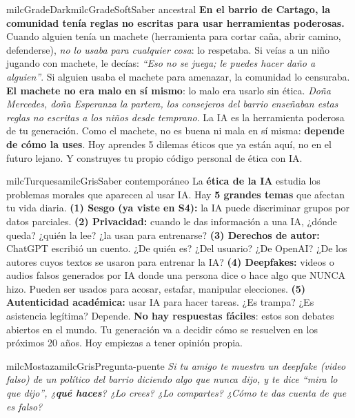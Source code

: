 \documentclass[11pt,letterpaper]{article}
\begin{document}
\begin{softbox}{milcGradeDark}{milcGradeSoft}{Saber ancestral}
\textbf{En el barrio de Cartago, la comunidad tenía reglas no escritas para usar herramientas poderosas.} Cuando alguien tenía un machete (herramienta para cortar caña, abrir camino, defenderse), \emph{no lo usaba para cualquier cosa}: lo respetaba. Si veías a un niño jugando con machete, le decías: \emph{``Eso no se juega; le puedes hacer daño a alguien''}. Si alguien usaba el machete para amenazar, la comunidad lo censuraba. \textbf{El machete no era malo en sí mismo}: lo malo era usarlo sin ética. \emph{Doña Mercedes, doña Esperanza la partera, los consejeros del barrio enseñaban estas reglas no escritas a los niños desde temprano}. La IA es la herramienta poderosa de tu generación. Como el machete, no es buena ni mala en sí misma: \textbf{depende de cómo la uses}. Hoy aprendes 5 dilemas éticos que ya están aquí, no en el futuro lejano. Y construyes tu propio código personal de ética con IA.
\end{softbox}

\begin{softbox}{milcTurquesa}{milcGris}{Saber contemporáneo}
La \textbf{ética de la IA} estudia los problemas morales que aparecen al usar IA. Hay \textbf{5 grandes temas} que afectan tu vida diaria. \textbf{(1) Sesgo (ya viste en S4):} la IA puede discriminar grupos por datos parciales. \textbf{(2) Privacidad:} cuando le das información a una IA, ¿dónde queda? ¿quién la lee? ¿la usan para entrenarse? \textbf{(3) Derechos de autor:} ChatGPT escribió un cuento. ¿De quién es? ¿Del usuario? ¿De OpenAI? ¿De los autores cuyos textos se usaron para entrenar la IA? \textbf{(4) Deepfakes:} videos o audios falsos generados por IA donde una persona dice o hace algo que NUNCA hizo. Pueden ser usados para acosar, estafar, manipular elecciones. \textbf{(5) Autenticidad académica:} usar IA para hacer tareas. ¿Es trampa? ¿Es asistencia legítima? Depende. \textbf{No hay respuestas fáciles}: estos son debates abiertos en el mundo. Tu generación va a decidir cómo se resuelven en los próximos 20 años. Hoy empiezas a tener opinión propia.
\end{softbox}

\begin{softbox}{milcMostaza}{milcGris}{Pregunta-puente}
\textit{Si tu amigo te muestra un \emph{deepfake} (video falso) de un político del barrio diciendo algo que nunca dijo, y te dice \emph{``mira lo que dijo''}, ¿\textbf{qué haces}? ¿Lo crees? ¿Lo compartes? ¿Cómo te das cuenta de que es falso?}
\end{softbox}
\end{document}
